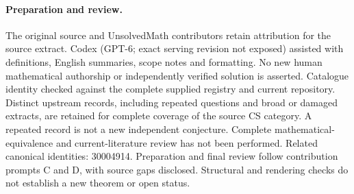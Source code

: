 \documentclass[11pt]{article}
\begin{document}
\paragraph{Preparation and review.}
The original source and UnsolvedMath contributors retain attribution for the source extract. Codex (GPT-6; exact serving revision not exposed) assisted with definitions, English summaries, scope notes and formatting. No new human mathematical authorship or independently verified solution is asserted. Catalogue identity checked against the complete supplied registry and current repository. Distinct upstream records, including repeated questions and broad or damaged extracts, are retained for complete coverage of the source CS category. A repeated record is not a new independent conjecture. Complete mathematical-equivalence and current-literature review has not been performed. Related canonical identities: 30004914. Preparation and final review follow contribution prompts C and D, with source gaps disclosed. Structural and rendering checks do not establish a new theorem or open status.
\label{end:statement}
\end{document}
